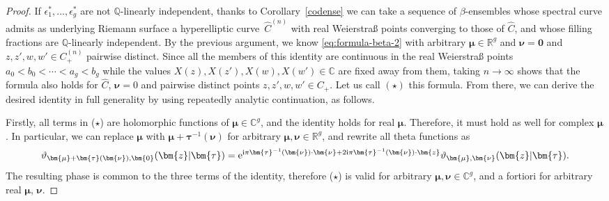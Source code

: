 \documentclass[10pt,a4paper]{amsart}
\numberwithin{equation}{section}
\begin{document}
\begin{proof}
If $\epsilon_1^*,\ldots,\epsilon_g^*$ are not $\mathbb{Q}$-linearly independent, thanks to Corollary~\ref{codense} we can take a sequence of $\beta$-ensembles whose spectral curve admits as underlying Riemann surface a hyperelliptic curve~$\widehat{C}^{(n)}$ with real Weierstra\ss{} points converging to those of $\widehat{C}$, and whose filling fractions are $\mathbb{Q}$-linearly independent. By the previous argument, we know \eqref{eq:formula-beta-2} with arbitrary $\bm{\mu} \in \mathbb{R}^g$ and $\bm{\nu} = \bm{0}$ and $z,z',w,w' \in C^{(n)}_+$ pairwise distinct. Since all the members of this identity are continuous in the real Weierstra\ss{} points $a_0 < b_0 < \cdots < a_g < b_g$ while the values $X(z),X(z'),X(w),X(w') \in \mathbb{C}$ are fixed away from them, taking $n \rightarrow \infty$ shows that the formula also holds for $\widehat{C}$, $\bm{\nu} = 0$ and pairwise distinct points $z,z',w,w' \in C_+$. Let us call $(\star)$ this formula. From there, we can derive the desired identity in full generality by using repeatedly analytic continuation, as follows.



Firstly, all terms in ($\star$) are holomorphic functions of $\bm{\mu} \in \mathbb{C}^{g}$, and the identity holds for real $\bm{\mu}$. Therefore, it must hold as well for complex $\bm{\mu}$. In particular, we can replace $\bm{\mu}$ with $\bm{\mu} + \bm{\tau}^{-1}(\bm{\nu})$ for arbitrary $\bm{\mu},\bm{\nu} \in \mathbb{R}^{g}$, and rewrite all theta functions as
\[
\vartheta_{\bm{\mu} + \bm{\tau}(\bm{\nu}),\bm{0}}(\bm{z}|\bm{\tau}) ={\rm e}^{{\rm i}\pi\bm{\tau}^{-1}(\bm{\nu}) \cdot \bm{\nu} + 2{\rm i}\pi \bm{\tau}^{-1}(\bm{\nu}) \cdot \bm{z}} \vartheta_{\bm{\mu},\bm{\nu}}(\bm{z}|\bm{\tau}).
\]
The resulting phase is common to the three terms of the identity, therefore ($\star$) is valid for arbitrary $\bm{\mu},\bm{\nu} \in \mathbb{C}^{g}$, and a fortiori for arbitrary real $\bm{\mu}$, $\bm{\nu}$.


\end{proof}
\end{document}
